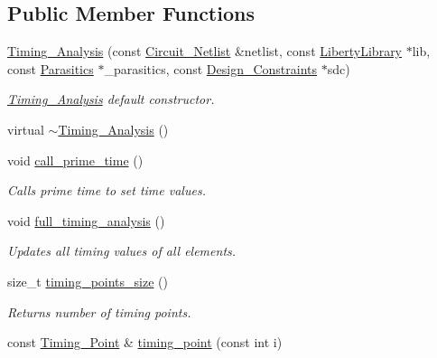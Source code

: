 \subsection*{Public Member Functions}
\begin{DoxyCompactItemize}
\item 
\hyperlink{classTiming__Analysis_1_1Timing__Analysis_aea46c3c9e4015f3b6802eca8a9c6d798}{Timing\-\_\-\-Analysis} (const \hyperlink{classCircuit__Netlist}{Circuit\-\_\-\-Netlist} \&netlist, const \hyperlink{classLibertyLibrary}{Liberty\-Library} $\ast$lib, const \hyperlink{configuration_8h_ac77efd4436b2f78ddba37713fc5d597c}{Parasitics} $\ast$\-\_\-parasitics, const \hyperlink{classDesign__Constraints}{Design\-\_\-\-Constraints} $\ast$sdc)
\begin{DoxyCompactList}\small\item\em \hyperlink{classTiming__Analysis_1_1Timing__Analysis}{Timing\-\_\-\-Analysis} default constructor. \end{DoxyCompactList}\item 
virtual \hyperlink{classTiming__Analysis_1_1Timing__Analysis_a769abb84f8a930cc46972ec6b1b6c9f5}{$\sim$\-Timing\-\_\-\-Analysis} ()
\item 
void \hyperlink{classTiming__Analysis_1_1Timing__Analysis_ae98e3de81890f6e7b23b58af151e17ab}{call\-\_\-prime\-\_\-time} ()
\begin{DoxyCompactList}\small\item\em Calls prime time to set time values. \end{DoxyCompactList}\item 
void \hyperlink{classTiming__Analysis_1_1Timing__Analysis_a16566352c5a2b9da08b2c65fadd774de}{full\-\_\-timing\-\_\-analysis} ()
\begin{DoxyCompactList}\small\item\em Updates all timing values of all elements. \end{DoxyCompactList}\item 
size\-\_\-t \hyperlink{classTiming__Analysis_1_1Timing__Analysis_accd0fc851f665860214942e93242585b}{timing\-\_\-points\-\_\-size} ()
\begin{DoxyCompactList}\small\item\em Returns number of timing points. \end{DoxyCompactList}\item 
const \hyperlink{classTiming__Analysis_1_1Timing__Point}{Timing\-\_\-\-Point} \& \hyperlink{classTiming__Analysis_1_1Timing__Analysis_a15ebc83dc364a1e6ec06723658059377}{timing\-\_\-point} (const int i)

\end{DoxyCompactItemize}
